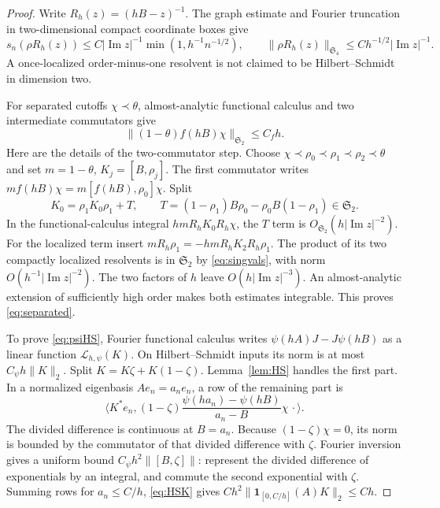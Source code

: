 \documentclass[11pt]{amsart}
\numberwithin{equation}{section}
\theoremstyle{remark}
\newcommand{\one}{\mathbf{1}}
\newcommand{\Stwo}{\mathfrak{S}_2}
\begin{document}
\begin{proof}
Write $R_h(z)=(hB-z)^{-1}$. The graph estimate and Fourier truncation in two-dimensional compact coordinate boxes give
\begin{equation}\label{eq:singvals}
s_n(\rho R_h(z))\le C|\operatorname{Im}z|^{-1}\min(1,h^{-1}n^{-1/2}),\qquad \|\rho R_h(z)\|_{\mathfrak S_4}\le Ch^{-1/2}|\operatorname{Im}z|^{-1} .
\end{equation}
A once-localized order-minus-one resolvent is not claimed to be Hilbert--Schmidt in dimension two.

For separated cutoffs $\chi\prec\theta$, almost-analytic functional calculus and two intermediate commutators give
\begin{equation}\label{eq:separated}
\|(1-\theta)f(hB)\chi\|_{\Stwo}\le C_fh .
\end{equation}
Here are the details of the two-commutator step. Choose $\chi\prec\rho_0\prec\rho_1\prec\rho_2\prec\theta$ and set $m=1-\theta$, $K_j=[B,\rho_j]$. The first commutator writes $mf(hB)\chi=m[f(hB),\rho_0]\chi$. Split
\begin{equation}\label{eq:K0split}
K_0=\rho_1K_0\rho_1+T,\qquad T=(1-\rho_1)B\rho_0-\rho_0B(1-\rho_1)\in\Stwo .
\end{equation}
In the functional-calculus integral $hmR_hK_0R_h\chi$, the $T$ term is $O_{\Stwo}(h|\operatorname{Im}z|^{-2})$. For the localized term insert $mR_h\rho_1=-hmR_hK_2R_h\rho_1$. The product of its two compactly localized resolvents is in $\Stwo$ by \eqref{eq:singvals}, with norm $O(h^{-1}|\operatorname{Im}z|^{-2})$. The two factors of $h$ leave $O(h|\operatorname{Im}z|^{-3})$. An almost-analytic extension of sufficiently high order makes both estimates integrable. This proves \eqref{eq:separated}.

To prove \eqref{eq:psiHS}, Fourier functional calculus writes $\psi(hA)J-J\psi(hB)$ as a linear function $\mathcal L_{h,\psi}(K)$. On Hilbert--Schmidt inputs its norm is at most $C_\psi h\|K\|_2$. Split $K=K\zeta+K(1-\zeta)$. Lemma~\ref{lem:HS} handles the first part. In a normalized eigenbasis $Ae_n=a_ne_n$, a row of the remaining part is
\begin{equation}\label{eq:row}
\Big\langle K^*e_n,(1-\zeta)\frac{\psi(ha_n)-\psi(hB)}{a_n-B}\chi\,\cdot\Big\rangle .
\end{equation}
The divided difference is continuous at $B=a_n$. Because $(1-\zeta)\chi=0$, its norm is bounded by the commutator of that divided difference with $\zeta$. Fourier inversion gives a uniform bound $C_\psi h^2\|[B,\zeta]\|$: represent the divided difference of exponentials by an integral, and commute the second exponential with $\zeta$. Summing rows for $a_n\le C/h$, \eqref{eq:HSK} gives $Ch^2\|\one_{[0,C/h]}(A)K\|_2\le Ch$.


\end{proof}
\end{document}
